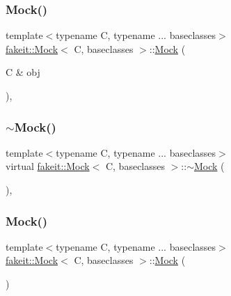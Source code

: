 \subsubsection{\texorpdfstring{Mock()}{Mock()}\hspace{0.1cm}{\footnotesize\ttfamily [6/18]}}
{\footnotesize\ttfamily template$<$typename C, typename ... baseclasses$>$ \\
\mbox{\hyperlink{classfakeit_1_1Mock}{fakeit\+::\+Mock}}$<$ C, baseclasses $>$\+::\mbox{\hyperlink{classfakeit_1_1Mock}{Mock}} (\begin{DoxyParamCaption}\item[{C \&}]{obj }\end{DoxyParamCaption})\hspace{0.3cm}{\ttfamily [inline]}, {\ttfamily [explicit]}}

\mbox{\label{classfakeit_1_1Mock_af5ecff29779ab75289c260d0a56705ab}} 
\subsubsection{\texorpdfstring{$\sim$Mock()}{~Mock()}\hspace{0.1cm}{\footnotesize\ttfamily [4/9]}}
{\footnotesize\ttfamily template$<$typename C, typename ... baseclasses$>$ \\
virtual \mbox{\hyperlink{classfakeit_1_1Mock}{fakeit\+::\+Mock}}$<$ C, baseclasses $>$\+::$\sim$\mbox{\hyperlink{classfakeit_1_1Mock}{Mock}} (\begin{DoxyParamCaption}{ }\end{DoxyParamCaption})\hspace{0.3cm}{\ttfamily [virtual]}, {\ttfamily [default]}}

\mbox{\label{classfakeit_1_1Mock_af7a86c609a2ee704ee09de6db066c7f4}} 
\subsubsection{\texorpdfstring{Mock()}{Mock()}\hspace{0.1cm}{\footnotesize\ttfamily [7/18]}}
{\footnotesize\ttfamily template$<$typename C, typename ... baseclasses$>$ \\
\mbox{\hyperlink{classfakeit_1_1Mock}{fakeit\+::\+Mock}}$<$ C, baseclasses $>$\+::\mbox{\hyperlink{classfakeit_1_1Mock}{Mock}} (\begin{DoxyParamCaption}{ }\end{DoxyParamCaption})\hspace{0.3cm}{\ttfamily [inline]}}

